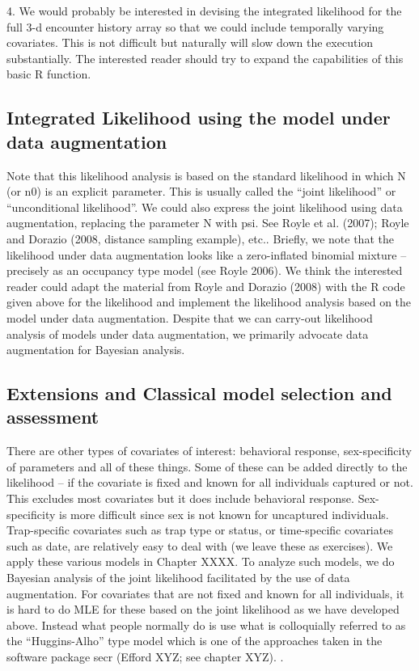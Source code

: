 4.	We would probably be interested in devising the integrated likelihood for the full 3-d encounter history array so that we could include temporally varying covariates. This is not difficult but naturally will slow down the execution substantially. The interested reader should try to expand the capabilities of this basic R function.

\subsection{Integrated Likelihood using the model under data augmentation } 

Note that this likelihood analysis is based on the standard likelihood
in which N (or n0) is an explicit parameter. This is usually called
the “joint likelihood” or “unconditional likelihood”.  We could also
express the joint likelihood using data augmentation, replacing the
parameter N with psi. See Royle et al. (2007); Royle and Dorazio
(2008, distance sampling example), etc.. Briefly, we note that the
likelihood under data augmentation looks like a zero-inflated binomial
mixture – precisely as an occupancy type model (see Royle 2006).  We
think the interested reader could adapt the material from Royle and
Dorazio (2008) with the R code given above for the likelihood and
implement the likelihood analysis based on the model under data
augmentation. Despite that we can carry-out likelihood analysis of
models under data augmentation, we primarily advocate data
augmentation for Bayesian analysis.


\subsection{ Extensions and Classical model selection and assessment}

There are other types of covariates of interest: behavioral response,
sex-specificity of parameters and all of these things. Some of these
can be added directly to the likelihood – if the covariate is fixed
and known for all individuals captured or not. This excludes most
covariates but it does include behavioral response. Sex-specificity is
more difficult since sex is not known for uncaptured
individuals. Trap-specific covariates such as trap type or status, or
time-specific covariates such as date, are relatively easy to deal
with (we leave these as exercises).  We apply these various models in
Chapter XXXX. To analyze such models, we do Bayesian analysis of the
joint likelihood facilitated by the use of data augmentation. For
covariates that are not fixed and known for all individuals, it is
hard to do MLE for these based on the joint likelihood as we have
developed above. Instead what people normally do is use what is
colloquially referred to as the “Huggins-Alho” type model which is one
of the approaches taken in the software package secr (Efford XYZ; see
chapter XYZ). .

